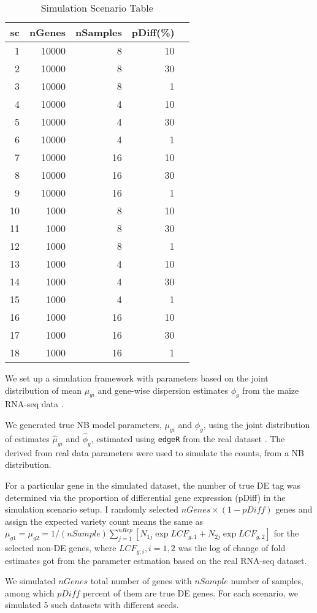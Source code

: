 \begin{table}[H]
\centering
\begin{tabular}{|r|r|r|r|r|}
\hline
sc & nGenes & nSamples & pDiff(\%) \\ 
\hline
1 & 10000 & 8 & 10 \\ 
\hline
2 & 10000 & 8 & 30 \\ 
\hline
3 & 10000 & 8 & 1 \\
\hline
4 & 10000 & 4 & 10 \\
\hline
5 & 10000 & 4 & 30 \\
\hline
6 & 10000 & 4 & 1 \\ 
\hline
7 & 10000 & 16 & 10 \\
\hline
8 & 10000 & 16 & 30 \\ 
\hline
9 & 10000 & 16 & 1 \\
\hline
10& 1000 & 8 & 10 \\
\hline
11 & 1000 & 8 & 30 \\
\hline
12 & 1000 & 8 & 1 \\ 
\hline
13 & 1000 & 4 & 10 \\
\hline
14 & 1000 & 4 & 30 \\
\hline
15 & 1000 & 4 & 1 \\ 
\hline
16 & 1000 & 16 & 10 \\
\hline
17 & 1000 & 16 & 30 \\ 
\hline
18 & 1000 & 16 & 1 \\ 
\hline
\end{tabular}
\caption{Simulation Scenario Table}
\label{tab:Scenario}
\end{table}


We set up a simulation framework with parameters based on the joint distribution of mean $\mu_{gi}$ and gene-wise dispersion estimates $\phi_g$ from the maize RNA-seq data \citep{paschold2012complementation}.

We generated true NB model parameters, $\mu_{gi}$ and $\phi_g$, using the joint distribution of estimates $\hat{\mu}_{gi}$ and $\hat{\phi}_g$, estimated using {\tt edgeR} from the real dataset \citep{paschold2012complementation}. The derived from real data parameters were used to simulate the counts, from a NB distribution. 


For a particular gene in the simulated dataset, the number of true DE tag was determined via the proportion of differential gene expression (pDiff) in the simulation scenario setup. I randomly selected $nGenes \times (1-pDiff)$ genes and assign the expected variety count means the same as $\mu_{g1} = \mu_{g2} = 1/(nSample)\sum_{j=1}^{nRep} \left[ N_{1j}\exp{LCF_{g,1}}+ N_{2j}\exp{LCF_{g,2}} \right]$ for the selected non-DE genes, where $LCF_{g,i}, i=1,2$ was the log of change of fold estimates got from the parameter estmation based on the real RNA-seq dataset.

We simulated $nGenes$ total number of genes with $nSample$ number of samples, among which $pDiff$ percent of them are true DE genes. For each scenario, we simulated 5 such datasets with different seeds.









